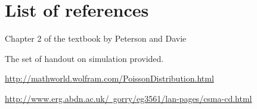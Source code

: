 \section{List of references}

\begin{description}
    \item Chapter 2 of the textbook by Peterson and Davie
    \item The set of handout on simulation provided.
    \item \href{http://mathworld.wolfram.com/PoissonDistribution.html}{http://mathworld.wolfram.com/PoissonDistribution.html}
    \item \href{http://www.erg.abdn.ac.uk/~gorry/eg3561/lan-pages/csma-cd.html}{http://www.erg.abdn.ac.uk/~gorry/eg3561/lan-pages/csma-cd.html}
\end{description}
